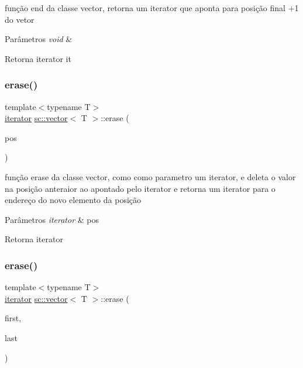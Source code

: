 função end da classe vector, retorna um iterator que aponta para posição final +1 do vetor 
\begin{DoxyParams}{Parâmetros}
{\em void} & \\
\hline
\end{DoxyParams}
\begin{DoxyReturn}{Retorna}
iterator it 
\end{DoxyReturn}
\mbox{\label{classsc_1_1vector_a9dcc8ea80726caae68ac935ca677abfe}} 
\subsubsection{\texorpdfstring{erase()}{erase()}\hspace{0.1cm}{\footnotesize\ttfamily [1/2]}}
{\footnotesize\ttfamily template$<$typename T$>$ \\
\mbox{\hyperlink{classsc_1_1vector_1_1iterator}{iterator}} \mbox{\hyperlink{classsc_1_1vector}{sc\+::vector}}$<$ T $>$\+::erase (\begin{DoxyParamCaption}\item[{\mbox{\hyperlink{classsc_1_1vector_1_1iterator}{iterator}}}]{pos }\end{DoxyParamCaption})}

função erase da classe vector, como como parametro um iterator, e deleta o valor na posição anteraior ao apontado pelo iterator e retorna um iterator para o endereço do novo elemento da posição 
\begin{DoxyParams}{Parâmetros}
{\em iterator} & pos \\
\hline
\end{DoxyParams}
\begin{DoxyReturn}{Retorna}
iterator 
\end{DoxyReturn}
\mbox{\label{classsc_1_1vector_ad6a6907a57004d43d2c37767ce9da5e5}} 
\subsubsection{\texorpdfstring{erase()}{erase()}\hspace{0.1cm}{\footnotesize\ttfamily [2/2]}}
{\footnotesize\ttfamily template$<$typename T$>$ \\
\mbox{\hyperlink{classsc_1_1vector_1_1iterator}{iterator}} \mbox{\hyperlink{classsc_1_1vector}{sc\+::vector}}$<$ T $>$\+::erase (\begin{DoxyParamCaption}\item[{\mbox{\hyperlink{classsc_1_1vector_1_1iterator}{iterator}}}]{first,  }\item[{\mbox{\hyperlink{classsc_1_1vector_1_1iterator}{iterator}}}]{last }\end{DoxyParamCaption})}

